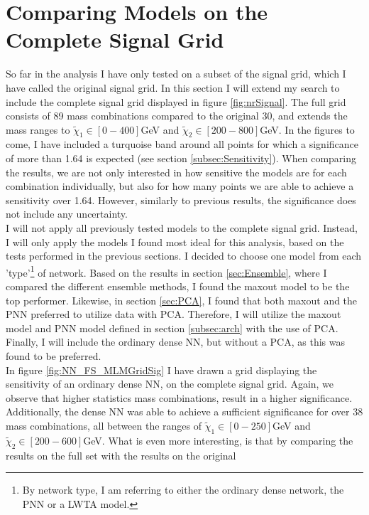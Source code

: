 \section{Comparing Models on the Complete Signal Grid}\label{sec:FS}
So far in the analysis I have only tested on a subset of the signal grid, which I have called the original signal grid. In this section 
I will extend my search to include the complete signal grid displayed in figure \ref{fig:nrSignal}. The full grid consists of 89 mass 
combinations compared to the original 30, and extends the mass ranges to $\tilde{\chi}_1 \in [0-400]$GeV and $\tilde{\chi}_2 \in [200-800]$GeV.
In the figures to come, I have included a turquoise band around all points for which a significance of more than 1.64 is expected (see section \ref{subsec:Sensitivity}).
When comparing the results, we are not only interested in how sensitive the models are for each combination individually, but also for how many points we are 
able to achieve a sensitivity over 1.64. However, similarly to previous results, the significance does not include any uncertainty.
\\
I will not apply all previously tested models to the complete signal grid. Instead, I will only apply the models I found most ideal for this analysis, based 
on the tests performed in the previous sections. I decided to choose one model from each 'type'\footnote{By network type, I am referring to either the ordinary dense network, the 
\ac{PNN} or a \ac{LWTA} model. } of network. Based on the results in section \ref{sec:Ensemble}, where I compared the different ensemble methods, I found the maxout model to be 
the top performer. Likewise, in section \ref{sec:PCA}, I found that both maxout and the \ac{PNN} preferred to utilize data with \ac{PCA}. Therefore, I will utilize the maxout model 
and \ac{PNN} model defined in section \ref{subsec:arch} with the use of \ac{PCA}. Finally, I will include the ordinary dense \ac{NN}, but without a \ac{PCA}, 
as this was found to be preferred.
\\
In figure \ref{fig:NN_FS_MLMGridSig} I have drawn a grid displaying the sensitivity of an ordinary dense \ac{NN}, on the complete signal grid. Again, we observe that higher statistics
mass combinations, result in a higher significance. Additionally, the dense \ac{NN} was able to achieve a sufficient significance for over 38 mass combinations, all between the ranges of 
$\tilde{\chi}_1 \in [0-250]$GeV and $\tilde{\chi}_2 \in [200-600]$GeV. What is even more interesting, is that by comparing the results on the full set with the results on the original 
